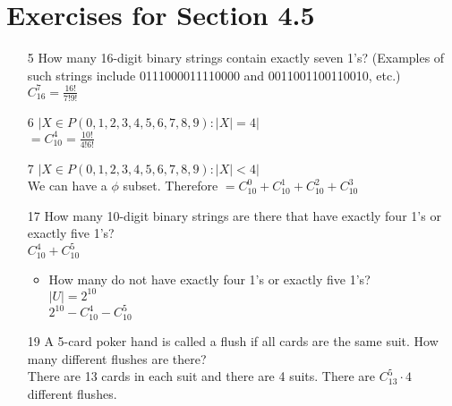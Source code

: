 \documentclass[12pt]{article}
\begin{document}
\section*{Exercises for Section 4.5}
\begin{enumerate}
    \item [5] How many 16-digit binary strings contain exactly seven 1’s? (Examples of such
strings include 0111000011110000 and 0011001100110010, etc.)\\
	$C_{16}^7 = \frac{16!}{7!9!}$
    \item [6] $|{X \in P({0,1,2,3,4,5,6,7,8,9}): |X| = 4}|$\\
	$= C_{10}^4 = \frac{10!}{4!6!}$
    \item [7] $|{X \in P({0,1,2,3,4,5,6,7,8,9}): |X| < 4}|$\\
	We can have a $\phi$ subset. Therefore $= C_{10}^0 + C_{10}^1 + C_{10}^2 + C_{10}^3$
    \item [17] How many 10-digit binary strings are there that have exactly four 1’s or exactly
five 1’s?\\
	$C_{10}^4 + C_{10}^5$
	\begin{itemize}
	    \item How many do not have exactly four 1’s or exactly five 1’s?\\
		$|U| = 2^{10}$\\
		$2^{10} - C_{10}^4 - C_{10}^5$
	\end{itemize}
    \item [19] A 5-card poker hand is called a flush if all cards are the same suit. How many
different flushes are there?\\
	There are 13 cards in each suit and there are 4 suits. There are $C_{13}^5 \cdot 4$ different flushes.
\end{enumerate}
\end{document}
